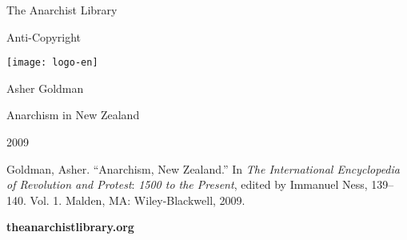 \documentclass[DIV=12,%
               BCOR=10mm,%
               headinclude=false,%
               footinclude=false,open=any,%
               fontsize=11pt,%
               twoside,%
               paper=210mm:11in]%
               {scrbook}
\begin{document}

\clearpage


\ifthispageodd{\strut\thispagestyle{empty}\clearpage}{}



\thispagestyle{empty}

\begin{center}

The Anarchist Library



\smallskip
Anti-Copyright



\bigskip
\texttt{[image: logo-en]}
\bigskip

\end{center}

\strut

\vfill

\begin{center}


Asher Goldman

Anarchism in New Zealand



2009


\bigskip


Goldman, Asher. “Anarchism, New Zealand.” In \emph{The International Encyclopedia of Revolution and Protest}: \emph{1500 to the Present}, edited by Immanuel Ness, 139–140. Vol. 1. Malden, MA: Wiley-Blackwell, 2009.
   

       

       

       

       

       
   



\bigskip
\textbf{theanarchistlibrary.org}


\end{center}

\end{document}
